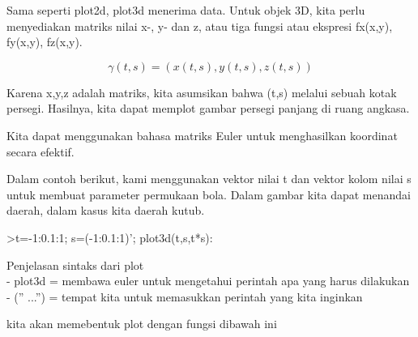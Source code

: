 \documentclass[a4paper,10pt]{article}
\begin{document}
\begin{eulernotebook}
\begin{eulercomment}
\begin{eulercomment}
\begin{eulercomment}
Sama seperti plot2d, plot3d menerima data. Untuk objek 3D, kita perlu
menyediakan matriks nilai x-, y- dan z, atau tiga fungsi atau ekspresi
fx(x,y), fy(x,y), fz(x,y).

\end{eulercomment}
\begin{eulerformula}
\[
\gamma(t,s) = (x(t,s),y(t,s),z(t,s))
\]
\end{eulerformula}
\begin{eulercomment}
Karena x,y,z adalah matriks, kita asumsikan bahwa (t,s) melalui sebuah
kotak persegi. Hasilnya, kita dapat memplot gambar persegi panjang di
ruang angkasa.

Kita dapat menggunakan bahasa matriks Euler untuk menghasilkan
koordinat secara efektif.

Dalam contoh berikut, kami menggunakan vektor nilai t dan vektor kolom
nilai s untuk membuat parameter permukaan bola. Dalam gambar kita
dapat menandai daerah, dalam kasus kita daerah kutub.

\end{eulercomment}
\begin{eulerprompt}
>t=-1:0.1:1; s=(-1:0.1:1)'; plot3d(t,s,t*s):
\end{eulerprompt}
\begin{eulercomment}
Penjelasan sintaks dari plot\\
- plot3d = membawa euler untuk mengetahui perintah apa yang harus
dilakukan\\
- (” ...”) = tempat kita untuk memasukkan perintah yang kita inginkan

\end{eulercomment}
\begin{eulercomment}
kita akan memebentuk plot dengan fungsi dibawah ini


\end{eulercomment}
\end{eulercomment}
\end{eulercomment}
\end{eulernotebook}
\end{document}

